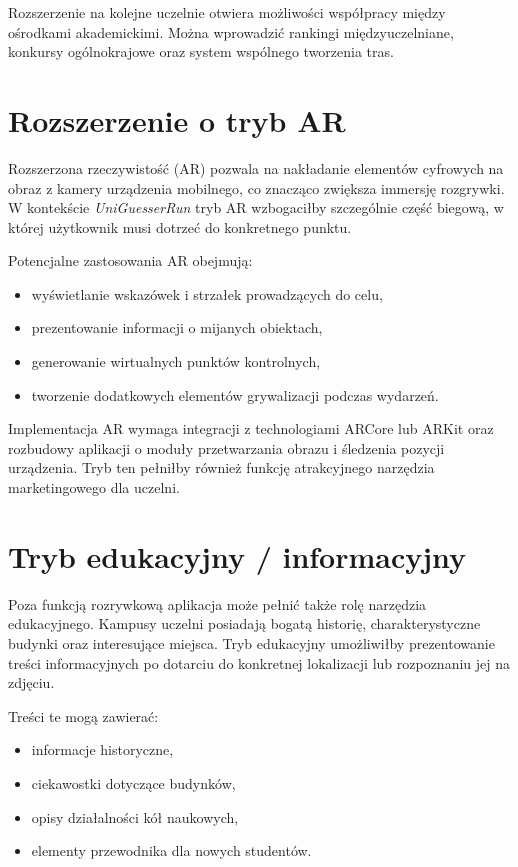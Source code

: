 Rozszerzenie na kolejne uczelnie otwiera możliwości współpracy między ośrodkami akademickimi. Można wprowadzić rankingi międzyuczelniane, konkursy ogólnokrajowe oraz system wspólnego tworzenia tras.

\section{Rozszerzenie o tryb AR}

Rozszerzona rzeczywistość (AR) pozwala na nakładanie elementów cyfrowych na obraz z kamery urządzenia mobilnego, co znacząco zwiększa immersję rozgrywki. W kontekście \textit{UniGuesserRun} tryb AR wzbogaciłby szczególnie część biegową, w której użytkownik musi dotrzeć do konkretnego punktu.

Potencjalne zastosowania AR obejmują:
\begin{itemize}
    \item wyświetlanie wskazówek i strzałek prowadzących do celu,
    \item prezentowanie informacji o mijanych obiektach,
    \item generowanie wirtualnych punktów kontrolnych,
    \item tworzenie dodatkowych elementów grywalizacji podczas wydarzeń.
\end{itemize}

Implementacja AR wymaga integracji z technologiami ARCore lub ARKit oraz rozbudowy aplikacji o moduły przetwarzania obrazu i śledzenia pozycji urządzenia. Tryb ten pełniłby również funkcję atrakcyjnego narzędzia marketingowego dla uczelni.

\section{Tryb edukacyjny / informacyjny}

Poza funkcją rozrywkową aplikacja może pełnić także rolę narzędzia edukacyjnego. Kampusy uczelni posiadają bogatą historię, charakterystyczne budynki oraz interesujące miejsca. Tryb edukacyjny umożliwiłby prezentowanie treści informacyjnych po dotarciu do konkretnej lokalizacji lub rozpoznaniu jej na zdjęciu.

Treści te mogą zawierać:
\begin{itemize}
    \item informacje historyczne,
    \item ciekawostki dotyczące budynków,
    \item opisy działalności kół naukowych,
    \item elementy przewodnika dla nowych studentów.
\end{itemize}

